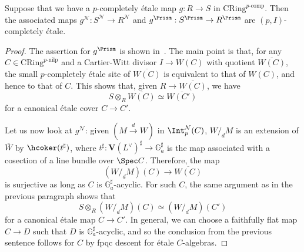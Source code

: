 \documentclass[10pt]{amsart}
\begin{document}
\begin{proposition}
   \label{prop:etale_goes_to_etale}
Suppose that we have a $p$-completely \'etale map $g:R\to S$ in $\mathrm{CRing}^{p\text{-comp}}$. Then the associated maps $g^{\mathcal{N}}:S^{\mathcal{N}}\to R^{\mathcal{N}}$ and $g^{\Prism}:S^{\Prism}\to R^{\Prism}$ are $(p,I)$-completely \'etale.
\end{proposition}
\begin{proof}
  The assertion for $g^\Prism$ is shown in~\cite[Remark 3.9]{bhatt2022prismatization}. The main point is that, for any $C\in \mathrm{CRing}^{p\text{-nilp}}$ and a Cartier-Witt divisor $I\to W(C)$ with quotient $\overline{W(C)}$, the small $p$-completely \'etale site of $\overline{W(C)}$ is equivalent to that of $W(C)$, and hence to that of $C$. This shows that, given $R\to \overline{W(C)}$, we have
\[
S\otimes_R\overline{W(C)} \simeq \overline{W(C')}
\]
for a canonical \'etale cover $C\to C'$.


Let us now look at $g^{\mathcal{N}}$: given $(M\xrightarrow{d} W)$ in $\Int_p^{\mathcal{N}}(C)$, $W/_dM$ is an extension of $\overline{W}$ by $\hcoker(t^\sharp)$, where $t^\sharp:\mathbf{V}(L^\vee)^\sharp\to \mathbb{G}_a^\sharp$ is the map associated with a cosection of a line bundle over $\Spec C$. Therefore, the map
\[
(W/_dM)(C)\to \overline{W(C)}
\]
is surjective as long as $C$ is $\mathbb{G}_a^\sharp$-acyclic. For such $C$, the same argument as in the previous paragraph shows that 
\[
S\otimes_R(W/_dM)(C)\simeq (W/_dM)(C')
\]
for a canonical \'etale map $C\to C'$. In general, we can choose a faithfully flat map $C\to D$ such that $D$ is $\mathbb{G}_a^\sharp$-acyclic, and so the conclusion from the previous sentence follows for $C$ by fpqc descent for \'etale $C$-algebras.
 \end{proof}
\end{document}
